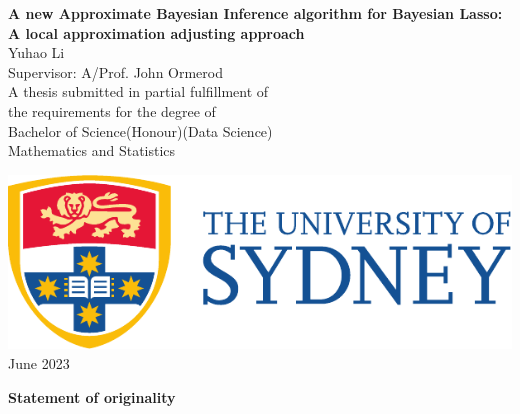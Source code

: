 \begin{titlepage}
\centering
{}
\vspace*{\fill}
\huge{\textbf{{\bf\Huge A new Approximate Bayesian Inference algorithm for Bayesian Lasso: A local approximation adjusting approach}}}\\



\vspace{2.5cm}
\LARGE{Yuhao Li}\\
\vspace{1cm}
\large{Supervisor: A/Prof. John Ormerod}\\
\large{A thesis submitted in partial fulfillment of \\ the requirements for the degree of \\  Bachelor of Science(Honour)(Data Science)} \\
\vspace{1cm}
\large{Mathematics and Statistics}\\
\vspace{1.5cm}
\date{September 2021}
    \includegraphics[scale=0.75]{UsydLogo.pdf}\\
\vspace{1.5cm}
\large{June 2023}\\
\vspace*{\fill}

\thispagestyle{empty}
\end{titlepage}



\pagebreak
\hspace{0pt}
\begin{center}
    \textbf{\large Statement of originality}\\
    \vspace{0.5cm}
\end{center}

